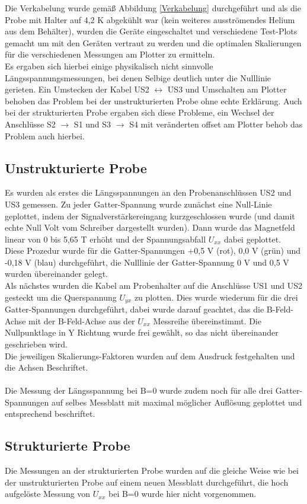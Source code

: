 \documentclass[10pt,a4paper]{article}
\begin{document}
 Die Verkabelung wurde gemäß Abbildung \ref{Verkabelung} \cite{1} durchgeführt und als die Probe mit Halter auf 4,2 K abgekühlt war (kein weiteres ausströmendes Helium aus dem Behälter), wurden die Geräte eingeschaltet und verschiedene Test-Plots gemacht um mit den Geräten vertraut zu werden und die optimalen Skalierungen für die verschiedenen Messungen am Plotter zu ermitteln.\\
Es ergaben sich hierbei einige physikalisch nicht sinnvolle Längsspannungsmessungen, bei denen Selbige deutlich unter die Nulllinie gerieten. Ein Umstecken der Kabel US2 $\leftrightarrow$ US3 und Umschalten am Plotter behoben das Problem bei der unstrukturierten Probe ohne echte Erklärung.
Auch bei der strukturierten Probe ergaben sich diese Probleme, ein Wechsel der Anschlüsse S2 $ \rightarrow $ S1 und S3 $ \rightarrow $ S4 mit veränderten offset am Plotter behob das Problem auch hierbei.
\subsection{Unstrukturierte Probe}
Es wurden als erstes die Längsspannungen an den Probenanschlüssen US2 und US3 gemessen. Zu jeder Gatter-Spannung wurde zunächst eine Null-Linie geplottet, indem der Signalverstärkereingang kurzgeschlossen wurde (und damit echte Null Volt vom Schreiber dargestellt wurden). Dann wurde das Magnetfeld linear von 0 bis 5,65 T erhöht und der Spannungsabfall $ U_{xx} $ dabei geplottet.\\
Diese Prozedur wurde für die Gatter-Spannungen  +0,5 V (rot),  0,0 V (grün) und -0,18 V (blau) durchgeführt, die Nulllinie der Gatter-Spannung 0 V und 0,5 V wurden übereinander gelegt. \\
Als nächstes wurden die Kabel am Probenhalter auf die Anschlüsse US1 und US2 gesteckt um die Querspannung $ U_{yx} $ zu plotten. Dies wurde wiederum für die drei Gatter-Spannungen durchgeführt, dabei wurde darauf geachtet, das die B-Feld-Achse mit der B-Feld-Achse aus der $ U_{xx} $ Messreihe übereinstimmt. Die Nullpunktlage in Y Richtung wurde frei gewählt, so das nicht übereinander geschrieben wird.\\
Die jeweiligen Skalierungs-Faktoren wurden auf dem Ausdruck festgehalten und die Achsen Beschriftet.\\ \\
Die Messung der Längsspannung bei B=0 wurde zudem noch für alle drei Gatter-Spannungen auf selbes Messblatt mit maximal möglicher Auflösung geplottet und entsprechend beschriftet.  
\subsection{Strukturierte Probe}
Die Messungen an der strukturierten Probe wurden auf die gleiche Weise wie bei der unstrukturierten Probe auf einem neuen Messblatt durchgeführt, die hoch aufgelöste Messung  von $ U_{xx} $ bei B=0 wurde hier nicht vorgenommen.
\end{document}
